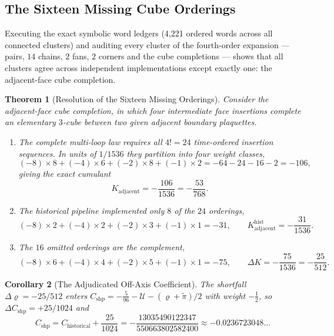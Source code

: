 \documentclass[11pt,a4paper]{article}
\newtheorem{theorem}{Theorem}[section]
\newtheorem{corollary}[theorem]{Corollary}
\theoremstyle{definition}
\newcommand{\Utwo}{\mathcal{U}}        %
\newcommand{\Cshp}{C_{\mathrm{shp}}}
\begin{document}
\subsection{The Sixteen Missing Cube Orderings}

Executing the exact symbolic word ledgers (4{,}221 ordered words across all connected clusters) and auditing every cluster of the fourth-order expansion --- pairs, $14$ chains, $2$ fans, $2$ corners and the cube completions --- shows that all clusters agree across independent implementations except exactly one: the adjacent-face cube completion.

\begin{theorem}[Resolution of the Sixteen Missing Orderings]\label{thm:missing_cube}
Consider the adjacent-face cube completion, in which four intermediate face insertions complete an elementary $3$-cube between two given adjacent boundary plaquettes.
\begin{enumerate}\itemsep2pt
  \item The complete multi-loop law requires all $4! = 24$ time-ordered insertion sequences. In units of $1/1536$ they partition into four weight classes,
  \begin{equation}\label{eq:multiloop_partition}
    (-8)\times8 + (-4)\times6 + (-2)\times8 + (-1)\times2 = -64-24-16-2 = -106,
  \end{equation}
  giving the exact cumulant
  \begin{equation}\label{eq:K_adj_true}
    K_{\mathrm{adjacent}} = -\frac{106}{1536} = -\frac{53}{768} .
  \end{equation}
  \item The historical pipeline implemented only $8$ of the $24$ orderings,
  \begin{equation}\label{eq:K_adj_hist}
    (-8)\times2 + (-4)\times2 + (-2)\times3 + (-1)\times1 = -31,
    \qquad K^{\mathrm{hist}}_{\mathrm{adjacent}} = -\frac{31}{1536}.
  \end{equation}
  \item The $16$ omitted orderings are the complement,
  \begin{equation}\label{eq:K_adj_missing}
    (-8)\times6 + (-4)\times4 + (-2)\times5 + (-1)\times1 = -75,
    \qquad \Delta K = -\frac{75}{1536} = -\frac{25}{512}.
  \end{equation}
\end{enumerate}
\end{theorem}

\begin{corollary}[The Adjudicated Off-Axis Coefficient]\label{cor:adjudicated_cshp}
The shortfall $\Delta\varrho = -25/512$ enters $\Cshp = -\tfrac{5}{96} - \Utwo - (\varrho + \tilde\pi)/2$ with weight $-\tfrac12$, so $\Delta\Cshp = +25/1024$ and
\begin{equation}\label{eq:C_shp_true}
  \Cshp = C_{\mathrm{historical}} + \frac{25}{1024} = -\frac{13035490122347}{550663802582400} \approx -0.0236723048\ldots
\end{equation}
\end{corollary}
\end{document}
